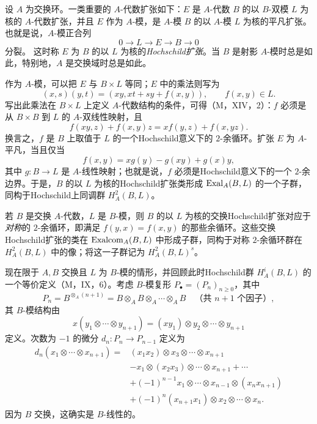 设 $A$ 为交换环。一类重要的 $A$-代数扩张如下：$E$ 是 $A$-代数 $B$ 的以 $B$-双模 $L$ 为核的 $A$-代数扩张，并且 $E$ 作为 $A$-模，是 $A$-模 $B$ 的以 $A$-模 $L$ 为核的平凡扩张。也就是说，$A$-模正合列
\[
 0\longrightarrow L\longrightarrow E\longrightarrow B\longrightarrow0
\]
分裂。
这时称 $E$ 为 $B$ 的以 $L$ 为核的\emph{Hochschild扩张}。当 $B$ 是射影 $A$-模时总是如此，特别地，$A$ 是交换域时总是如此。

作为 $A$-模，可以把 $E$ 与 $B\times L$ 等同；$E$ 中的乘法则写为
\[
 (x,s)(y,t)=(xy,xt+sy+f(x,y)),\qquad f(x,y)\in L.
\]
写出此乘法在 $B\times L$ 上定义 $A$-代数结构的条件，可得（M，XIV，2）：$f$ 必须是从 $B\times B$ 到 $L$ 的 $A$-双线性映射，且
\begin{equation}
 f(xy,z)+f(x,y)z=xf(y,z)+f(x,yz).
 \tag{18.4.3.1}
\end{equation}
换言之，$f$ 是 $B$ 上取值于 $L$ 的一个Hochschild意义下的 $2$-余循环。扩张 $E$ 为 $A$-平凡，当且仅当
\begin{equation}
 f(x,y)=xg(y)-g(xy)+g(x)y,
 \tag{18.4.3.2}
\end{equation}
其中 $g:B\to L$ 是 $A$-线性映射；也就是说，$f$ 必须是Hochschild意义下的一个 $2$-余边界。于是，$B$ 的以 $L$ 为核的Hochschild扩张类形成 $\operatorname{Exal}_A(B,L)$ 的一个子群，同构于Hochschild上同调群 $H_A^2(B,L)$。

若 $B$ 是交换 $A$-代数，$L$ 是 $B$-模，则 $B$ 的以 $L$ 为核的交换Hochschild扩张对应于\emph{对称}的 $2$-余循环，即满足 $f(y,x)=f(x,y)$ 的那些余循环。这些交换Hochschild扩张的类在 $\operatorname{Exalcom}_A(B,L)$ 中形成子群，同构于对称 $2$-余循环群在 $H_A^2(B,L)$ 中的像；将这一子群记为 $H_A^2(B,L)^s$。

现在限于 $A,B$ 交换且 $L$ 为 $B$-模的情形，并回顾此时Hochschild群 $H_A^i(B,L)$ 的一个等价定义（M，IX，6）。考虑 $B$-模复形 $P_\bullet=(P_n)_{n\geq0}$，其中
\[
 P_n=B^{\otimes_A(n+1)}=B\otimes_AB\otimes_A\cdots\otimes_AB
 \quad\text{（共 $n+1$ 个因子）},
\]
其 $B$-模结构由
\[
 x(y_1\otimes\cdots\otimes y_{n+1})=(xy_1)\otimes y_2\otimes\cdots\otimes y_{n+1}
\]
定义。次数为 $-1$ 的微分 $d_n:P_n\to P_{n-1}$ 定义为
\[
\begin{aligned}
 d_n(x_1\otimes\cdots\otimes x_{n+1})
 ={}&(x_1x_2)\otimes x_3\otimes\cdots\otimes x_{n+1}\\
 &-x_1\otimes(x_2x_3)\otimes\cdots\otimes x_{n+1}+\cdots\\
 &+(-1)^{n-1}x_1\otimes\cdots\otimes x_{n-1}\otimes(x_nx_{n+1})\\
 &+(-1)^n(x_{n+1}x_1)\otimes x_2\otimes\cdots\otimes x_n.
\end{aligned}
\]
因为 $B$ 交换，这确实是 $B$-线性的。


